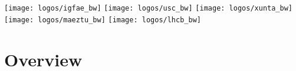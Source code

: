 \documentclass[aspectratio=169,9pt,handout]{beamer}
\newcommand{\pdfnote}[1]{}
\begin{document}




\begin{frame}[plain,overlaytitlepage=0.9,backgroundpicture=gpx/aiandes.pdf]
  \begin{minipage}[b][\textheight][b]{5cm}
    \texttt{[image: logos/igfae\_bw]}\hspace{1mm}
    \texttt{[image: logos/usc\_bw]}\hspace{1mm}
    \texttt{[image: logos/xunta\_bw]}\hspace{1mm}\\[2mm]
    \texttt{[image: logos/maeztu\_bw]}\hspace{1mm}
    \texttt{[image: logos/lhcb\_bw]}\\[-1mm]
  \end{minipage}
\end{frame}

\begin{frame}[plain,backgroundpicture=gpx/aiandes.pdf,overlaytoc=0.9]
  \addtocounter{framenumber}{-1}
  \hspace*{8cm}\begin{minipage}{8cm}
    \tableofcontents
  \end{minipage}
  \pdfnote{The talk consists in a brief overview of the Bs2JpsiPhi channel and the selection.}
  \pdfnote{Then I will talk about the meat of this talk: decay-time resolution and acceptance}
  \pdfnote{Then I will talk a bit of angular accepntace and finally a sneak peek of Preliminary fit resutls of the full run2 analysis.}
\end{frame}







\section{Overview}
\end{document}
